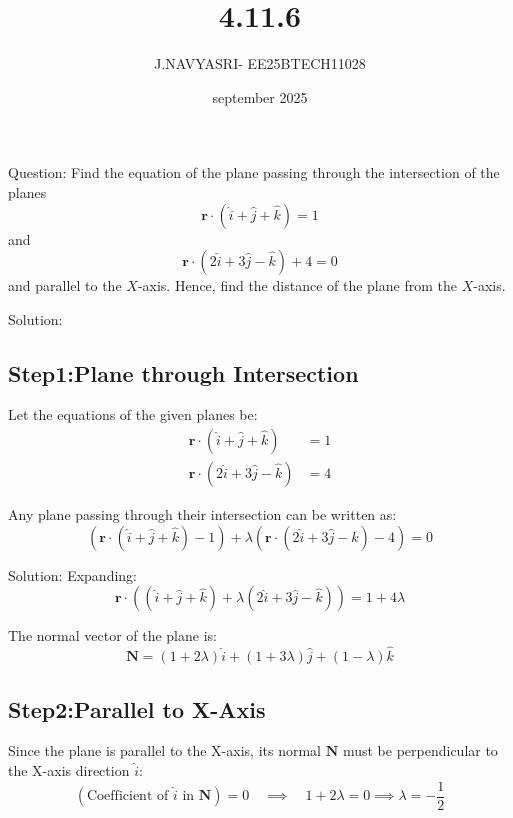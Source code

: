 \documentclass{beamer}
\title %
{4.11.6}
\date{september 2025}
\author %
{J.NAVYASRI- EE25BTECH11028}
\begin{document}
\frame{\titlepage}
\begin{frame}{Question:}
   Find the equation of the plane passing through the intersection of the planes 
\[
\mathbf{r}\cdot (\hat{i} + \hat{j} + \hat{k}) = 1
\]
and 
\[
\mathbf{r} \cdot (2\hat{i} + 3\hat{j} - \hat{k}) + 4 = 0
\]
and parallel to the $X$-axis. Hence, find the distance of the plane from the $X$-axis.
\end{frame}

\begin{frame}{Solution:}
\subsection*{Step1:Plane through Intersection}
Let the equations of the given planes be:
\begin{align}
\mathbf{r}  \cdot (\hat{i} + \hat{j} + \hat{k}) &= 1 \label{eq:plane1} \\
\mathbf{r} \cdot (2\hat{i} + 3\hat{j} - \hat{k}) &= 4 \label{eq:plane2}
\end{align}

Any plane passing through their intersection can be written as:
\begin{equation}
\left( \mathbf{r}  \cdot (\hat{i} + \hat{j} + \hat{k}) - 1\right) + \lambda \left(\mathbf{r}  \cdot (2\hat{i} + 3\hat{j} - \hat{k}) - 4 \right) = 0
\label{eq:intersect_plane}
\end{equation}
\end{frame}

\begin{frame}{Solution:}
Expanding:
\begin{equation}
\mathbf{r}  \cdot \left( (\hat{i} + \hat{j} + \hat{k}) + \lambda (2\hat{i} + 3\hat{j} - \hat{k}) \right) = 1 + 4\lambda
\label{eq:expanded}
\end{equation}

The normal vector of the plane is:
\begin{equation}
\mathbf{N} = (1 + 2\lambda)\hat{i} + (1 + 3\lambda)\hat{j} + (1 - \lambda) \hat{k}
\label{eq:normal}
\end{equation}

\subsection*{Step2:Parallel to X-Axis}

Since the plane is parallel to the X-axis, its normal $\mathbf{N}$ must be perpendicular to the X-axis direction $\hat{i}$:
\begin{equation}
( \text{Coefficient of } \hat{i} \text{ in } \mathbf{N} ) = 0 \quad \implies \quad 1 + 2\lambda = 0 \implies \lambda = -\frac{1}{2}
\label{eq:lambda}
\end{equation}
\end{frame}
\end{document}
